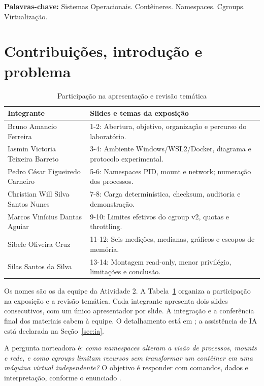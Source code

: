 \documentclass[12pt,a4paper]{article}
\newcommand{\secao}[1]{\clearpage\section{#1}}
\begin{document}
\vspace{\baselineskip}
\noindent\textbf{Palavras-chave:} Sistemas Operacionais. Contêineres. Namespaces. Cgroups. Virtualização.

\clearpage
\thispagestyle{empty}
\begin{singlespace}\small\tableofcontents\end{singlespace}

\secao{Contribuições, introdução e problema}
\begin{table}[H]
\centering\caption{Participação na apresentação e revisão temática}\label{tab:contribuicoes}
\begin{singlespace}\small
\begin{tabularx}{\textwidth}{>{\raggedright\arraybackslash}p{}X}
\toprule\textbf{Integrante} & \textbf{Slides e temas da exposição}\\\midrule
Bruno Amancio Ferreira & 1-2: Abertura, objetivo, organização e percurso do laboratório.\\
Iasmin Victoria Teixeira Barreto & 3-4: Ambiente Windows/WSL2/Docker, diagrama e protocolo experimental.\\
Pedro César Figueiredo Carneiro & 5-6: Namespaces PID, mount e network; numeração dos processos.\\
Christian Will Silva Santos Nunes & 7-8: Carga determinística, checksum, auditoria e demonstração.\\
Marcos Vinícius Dantas Aguiar & 9-10: Limites efetivos do cgroup v2, quotas e throttling.\\
Sibele Oliveira Cruz & 11-12: Seis medições, medianas, gráficos e escopos de memória.\\
Silas Santos da Silva & 13-14: Montagem read-only, menor privilégio, limitações e conclusão.\\
\bottomrule
\end{tabularx}\end{singlespace}
\end{table}
Os nomes são os da equipe da Atividade 2. A Tabela~\ref{tab:contribuicoes} organiza a participação na exposição e a revisão temática. Cada integrante apresenta dois slides consecutivos, com um único apresentador por slide. A integração e a conferência final dos materiais cabem à equipe. O detalhamento está em ; a assistência de IA está declarada na Seção~\ref{sec:ia}.

A pergunta norteadora é: \textit{como namespaces alteram a visão de processos, mounts e rede, e como cgroups limitam recursos sem transformar um contêiner em uma máquina virtual independente?} O objetivo é responder com comandos, dados e interpretação, conforme o enunciado \cite{enunciado}.
\end{document}
